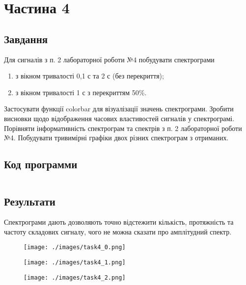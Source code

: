\section{Частина 4}
\label{sec:task4}

\subsection{Завдання}
\label{subsec:task4_task}

Для сигналів з п. 2 лабораторної роботи №4 побудувати спектрограми
\begin{enumerate}
    \item з вікном тривалості 0,1 с та 2 с (без перекриття);
    \item з вікном тривалості 1 с з перекриттям 50\%.
\end{enumerate}
Застосувати функції colorbar для візуалізації значень спектрограми.
Зробити висновки щодо відображення часових властивостей сигналів у
спектрограмі. Порівняти інформативність спектрограм та спектрів з п. 2
лабораторної роботи №4. Побудувати тривимірні графіки двох різних
спектрограм з отриманих.

\subsection{Код программи}
\label{subsec:task4_code}
\inputminted{python}{../src/task4.py}

\subsection{Результати}
\label{subsec:task4_results}

Спектрограми дають дозволяють точно відстежити кількість, протяжність та частоту
складових сигналу, чого не можна сказати про амплітудний спектр.

\begin{figure}[!ht]
    \centering
    \texttt{[image: ./images/task4\_0.png]}
\end{figure}

\begin{figure}[!ht]
    \centering
    \texttt{[image: ./images/task4\_1.png]}
\end{figure}

\begin{figure}[!ht]
    \centering
    \texttt{[image: ./images/task4\_2.png]}
\end{figure}

